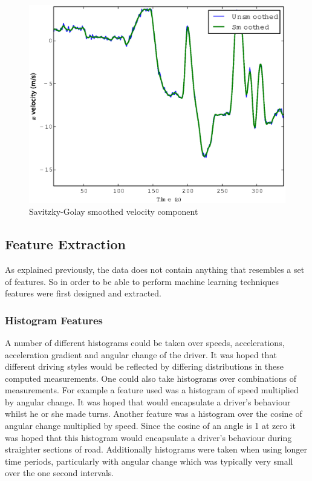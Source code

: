 \documentclass[a4paper, 11pt, twocolumn]{report}
\begin{document}
\begin{figure}[h]
    \center
    \includegraphics[width=\linewidth]{savgolsmooth}
    \caption{Savitzky-Golay smoothed velocity component}
    \label{fig:savgolsmooth}
\end{figure}
\subsection{Feature Extraction}
As explained previously, the data does not contain anything that resembles a set of features. So in order to be able to perform machine learning techniques features were first designed and extracted.

\subsubsection{Histogram Features}
A number of different histograms could be taken over speeds, accelerations, acceleration gradient and angular change of the driver. It was hoped that different driving styles would be reflected by differing distributions in these computed measurements. One could also take histograms over combinations of measurements. For example a feature used was a histogram of speed multiplied by angular change. It was hoped that would encapsulate a driver's behaviour whilst he or she made turns. Another feature was a histogram over the cosine of angular change multiplied by speed. Since the cosine of an angle is 1 at zero it was hoped that this histogram would encapsulate a driver's behaviour during straighter sections of road. Additionally histograms were taken when using longer time periods, particularly with angular change which was typically very small over the one second intervals.
\end{document}
